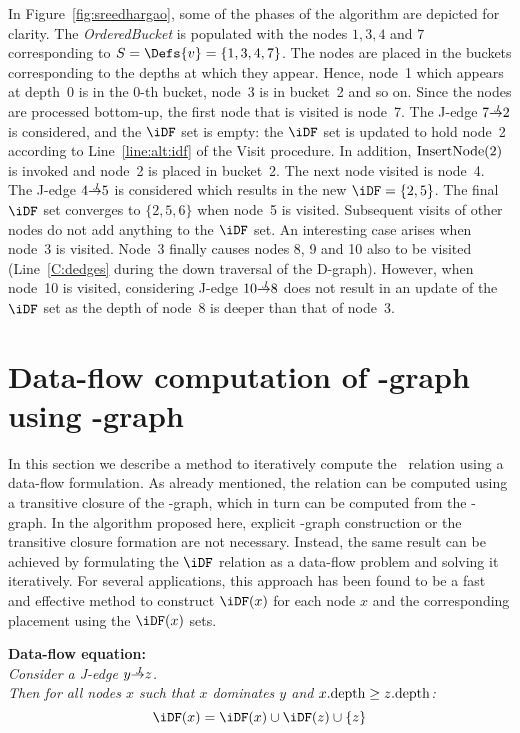 {In Figure~\ref{fig:sreedhargao}, some of the phases of the algorithm are depicted for clarity. 
The \textit{OrderedBucket} is populated with the nodes $1,3,4$ and $7$ corresponding to $S=\Defs{v}=\{1,3,4,7\}$. 
The nodes are placed in the buckets corresponding to the depths at which they appear. 
Hence, node~1 which appears at depth~0 is in the 0-th bucket, node~3 is in bucket~2 and so on. 
Since the nodes are processed bottom-up, the first node that is visited is node~7. 
The J-edge $7 \st{J} 2$ is considered, and the $\iDF$ set is empty: 
the $\iDF$ set is updated to hold node~2 according to Line~\ref{line:alt:idf} of the Visit procedure. 
In addition, $\textrm{InsertNode}(2)$ is invoked and node~2 is placed in bucket~2. 
The next node visited is node~4. 
The J-edge $4 \st{J} 5$ is considered which results in the new $\iDF = \{2,5\}$. 
The final $\iDF$ set converges to $\{2,5,6\}$ when node~5 is visited. 
Subsequent visits of other nodes do not add anything to the $\iDF$ set. 
An interesting case arises when node~3 is visited. 
Node~3 finally causes nodes 8, 9 and 10 also to be visited (Line~\ref{C:dedges} during the down traversal of the D-graph). 
However, when node~10 is visited, considering J-edge $10 \st{J} 8$ does not result in an update of the $\iDF$ set as the depth of node~8 is deeper than that of node~3.


\section{Data-flow computation of \iDF-graph using \DJ-graph}
In this section we describe a method to iteratively compute the \iDF~relation using a data-flow formulation. 
As already mentioned, the \iDF relation can be computed using a transitive closure of the \DF-graph, which in turn can be computed from the \DJ-graph. 
In the algorithm proposed here, explicit \DF-graph construction or the transitive closure formation are not necessary. 
Instead, the same result can be achieved by formulating the $\iDF$ relation as a data-flow problem and solving it iteratively. 
For several applications, this approach has been found to be a fast and effective method to construct $\iDF(x)$ for each node $x$ and the corresponding \phifun placement using the $\iDF(x)$ sets.

\begin{center}   \textbf{Data-flow equation:}\\   {\it 
Consider a J-edge $y \st{J} z$.\\
Then for all nodes $x$ such that $x$ dominates $y$ and $x.\textrm{depth} \geq z.\textrm{depth}$:   $$\iDF(x) = \iDF(x) \cup \iDF(z) \cup \{z\}$$} \end{center}

}

